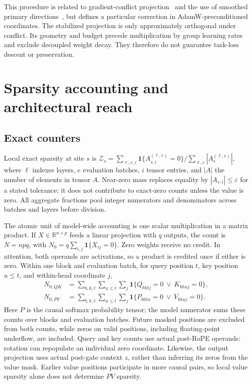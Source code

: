 This procedure is related to gradient-conflict projection~\citep{yu2020pcgrad}
and the use of smoothed primary directions~\citep{hsieh2024bloop}, but defines
a particular correction in AdamW-preconditioned coordinates. The stabilized
projection is only approximately orthogonal under conflict. Its geometry and
budget precede multiplication by group learning rates and exclude decoupled
weight decay. They therefore do not guarantee task-loss descent or preservation.

\section{Sparsity accounting and architectural reach}
\label{app:accounting}

\subsection{Exact counters}

Local exact sparsity at site $s$ is
$\mathcal{Z}_s=\sum_{\ell,e,i}\mathbf{1}\{A^{(\ell,e)}_{s,i}=0\}/
\sum_{\ell,e}|A_s^{(\ell,e)}|$, where $\ell$ indexes layers, $e$ evaluation
batches, $i$ tensor entries, and $|A|$ the number of elements in tensor $A$. Near-zero mass replaces equality by
$|A_{s,i}|\leq\varepsilon$ for a stated tolerance; it does not contribute to
exact-zero counts unless the value is zero. All aggregate fractions pool
integer numerators and denominators across batches and layers before division.

The atomic unit of model-wide accounting is one scalar multiplication in a
matrix product. If $X\in\mathbb{R}^{n\times p}$ feeds a linear projection with
$q$ outputs, the count is $N=npq$, with $N_0=q\sum_{i,j}\mathbf{1}\{X_{ij}=0\}$.
Zero weights receive no credit. In attention, both operands are activations,
so a product is credited once if either is zero. Within one block and
evaluation batch, for query position $t$,
key position $u\leq t$, and within-head coordinate $j$,
\begin{align}
N_{0,QK}&=\sum_{b,h,t}\sum_{u\leq t}\sum_j
\mathbf{1}\{Q_{bhtj}=0\ \lor\ K_{bhuj}=0\},\label{eq:qk-count}\\
N_{0,PV}&=\sum_{b,h,t}\sum_{u\leq t}\sum_j
\mathbf{1}\{P_{bhtu}=0\ \lor\ V_{bhuj}=0\}.\label{eq:pv-count}
\end{align}
Here $P$ is the causal softmax probability tensor; the model numerator sums
these counts over blocks and evaluation batches. Future masked positions
are excluded from both counts, while zeros on valid positions, including
floating-point underflow, are included. Query and key counts use actual
post-RoPE operands: rotation can repopulate an individual zero coordinate.
Likewise, the output projection uses actual post-gate context $z$, rather than
inferring its zeros from the value mask. Earlier value positions participate
in more causal pairs, so local value sparsity alone does not determine $PV$
sparsity.

